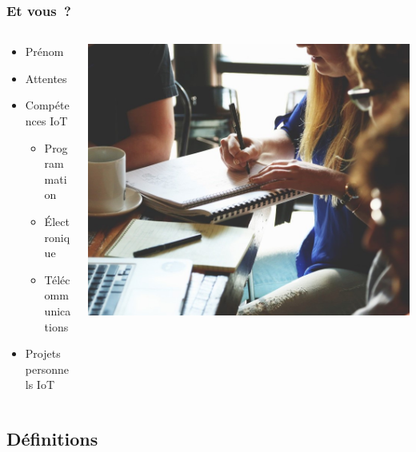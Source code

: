 \documentclass[aspectratio=169,utf8,french]{beamer}
\begin{document}
\begin{frame}
  \frametitle{Et vous~?}
  \begin{columns}
    \begin{column}{.4\textwidth}
      \begin{itemize}
        \item Prénom
        \item Attentes
        \item Compétences IoT
          \begin{itemize}
            \item Programmation
            \item Électronique
            \item Télécommunications
          \end{itemize}
        \item Projets personnels IoT
      \end{itemize}
    \end{column}
    \begin{column}{.6\textwidth}
      \begin{flushright}
        \includegraphics[width=.9\linewidth]{pictures/etvous.jpg}
      \end{flushright}
    \end{column}
  \end{columns}
\end{frame}

\subsection{Définitions}
\end{document}
